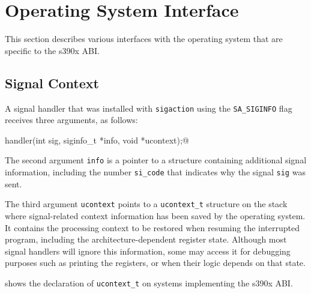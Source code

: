 \documentclass[USenglish,fontsize=11pt,twoside,%
  toc=bib,toc=idx,toc=graduated,numbers=noendperiod,
  bookmarks=true,
  bookmarksnumbered=true,
  bookmarksopen=true,
  bookmarksopenlevel=1,
  breaklinks=true,
  colorlinks=true,
  linkcolor=black,
  pdfpagelayout={TwoPageRight},
  pdfusetitle=true
]{scrreprt}
\newcommand{\ABINAME}{s390x}
\newcommand{\ABINAME}{s390}
\begin{document}
\section{Operating System Interface}
This section describes various interfaces with the operating system that
are specific to the \ABINAME{} ABI\@.

\subsection{Signal Context}
A signal handler that was installed with \texttt{sigaction} using the
\texttt{SA\_SIGINFO} flag receives three arguments, as follows:
\begin{center}
  \lstinline@void handler(int sig, siginfo_t *info, void *ucontext);@
\end{center}
The second argument \texttt{info} is a pointer to a structure containing
additional signal information, including the number \texttt{si\_code} that
indicates why the signal \texttt{sig} was sent.

The third argument \texttt{ucontext} points to a \texttt{ucontext\_t}
structure on the stack where signal-related context information has been
saved by the operating system.  It contains the processing context to be
restored when resuming the interrupted program, including the
architecture-dependent register state.  Although most signal handlers will
ignore this information, some may access it for debugging purposes such as
printing the registers, or when their logic depends on that state.

 shows the declaration of \texttt{ucontext\_t} on
systems implementing the \ABINAME{} ABI.
\end{document}

